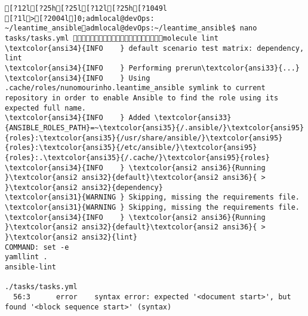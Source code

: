 \documentclass{scrartcl}
\begin{document}
\begin{Verbatim}
[?12l[?25h[?25l[?12l[?25h[?1049l
[?1l>[?2004l]0;admlocal@devOps: ~/leantime_ansibleadmlocal@devOps:~/leantime_ansible$ nano tasks/tasks.yml molecule lint
\textcolor{ansi34}{INFO    } default scenario test matrix: dependency, lint
\textcolor{ansi34}{INFO    } Performing prerun\textcolor{ansi33}{...}
\textcolor{ansi34}{INFO    } Using .cache/roles/nunomourinho.leantime_ansible symlink to current repository in order to enable Ansible to find the role using its expected full name.
\textcolor{ansi34}{INFO    } Added \textcolor{ansi33}{ANSIBLE_ROLES_PATH}=~\textcolor{ansi35}{/.ansible/}\textcolor{ansi95}{roles}:\textcolor{ansi35}{/usr/share/ansible/}\textcolor{ansi95}{roles}:\textcolor{ansi35}{/etc/ansible/}\textcolor{ansi95}{roles}:.\textcolor{ansi35}{/.cache/}\textcolor{ansi95}{roles}
\textcolor{ansi34}{INFO    } \textcolor{ansi2 ansi36}{Running }\textcolor{ansi2 ansi32}{default}\textcolor{ansi2 ansi36}{ > }\textcolor{ansi2 ansi32}{dependency}
\textcolor{ansi31}{WARNING } Skipping, missing the requirements file.
\textcolor{ansi31}{WARNING } Skipping, missing the requirements file.
\textcolor{ansi34}{INFO    } \textcolor{ansi2 ansi36}{Running }\textcolor{ansi2 ansi32}{default}\textcolor{ansi2 ansi36}{ > }\textcolor{ansi2 ansi32}{lint}
COMMAND: set -e
yamllint .
ansible-lint

./tasks/tasks.yml
  56:3      error    syntax error: expected '<document start>', but found '<block sequence start>' (syntax)


\end{Verbatim}
\end{document}
